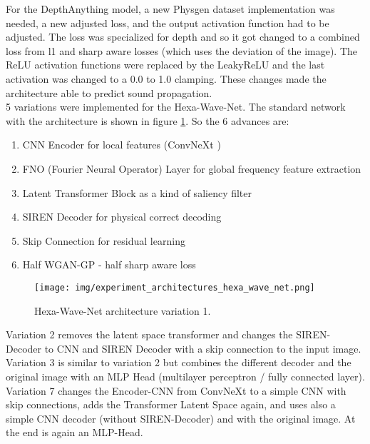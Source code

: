 		For the DepthAnything model, a new Physgen dataset implementation was needed, a new adjusted loss, and the output activation function had to be adjusted. The loss was specialized for depth and so it got changed to a combined loss from l1 and sharp aware losses (which uses the deviation of the image). The ReLU activation functions were replaced by the LeakyReLU and the last activation was changed to a 0.0 to 1.0 clamping. These changes made the architecture able to predict sound propagation.\\
		5 variations were implemented for the Hexa-Wave-Net. The standard network with the architecture is shown in figure \ref{fig:experiment_architecture_hexa_wave_net}. So the 6 advances are:
		\begin{enumerate}[itemsep=1mm, parsep=0pt]
			\item CNN Encoder for local features (ConvNeXt \cite{liu2022convnet2020s})
			\item FNO (Fourier Neural Operator) Layer for global frequency feature extraction
			\item Latent Transformer Block as a kind of saliency filter
			\item SIREN Decoder for physical correct decoding
			\item Skip Connection for residual learning
			\item Half WGAN-GP - half sharp aware loss
		\end{enumerate}
		
		\begin{figure}[H]
			\centering
			\texttt{[image: img/experiment\_architectures\_hexa\_wave\_net.png]}
			\caption[Hexa-Wave-Net architecture variation 1.]{Hexa-Wave-Net architecture variation 1.}
			\label{fig:experiment_architecture_hexa_wave_net}
		\end{figure}
		\FloatBarrier
		
		\clearpage
		Variation 2 removes the latent space transformer and changes the SIREN-Decoder to CNN and SIREN Decoder with a skip connection to the input image.\\
		Variation 3 is similar to variation 2 but combines the different decoder and the original image with an MLP Head (multilayer perceptron / fully connected layer).\\
		Variation 7 changes the Encoder-CNN from ConvNeXt to a simple CNN with skip connections, adds the Transformer Latent Space again, and uses also a simple CNN decoder (without SIREN-Decoder) and with the original image. At the end is again an MLP-Head.
		
